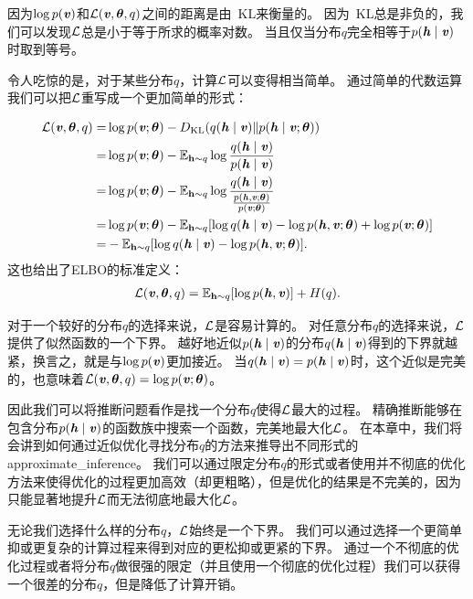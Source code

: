 因为$\log p(\Vv)$和$\CalL(\Vv,{\Vtheta},q)$之间的距离是由~\gls{KL}来衡量的。
因为~\gls{KL}总是非负的，我们可以发现$\CalL$总是小于等于所求的概率对数。
当且仅当分布$q$完全相等于$p(\Vh\mid\Vv)$时取到等号。


令人吃惊的是，对于某些分布$q$，计算$\CalL$可以变得相当简单。
通过简单的代数运算我们可以把$\CalL$重写成一个更加简单的形式：

\begin{align}
\CalL(\Vv,{\Vtheta},q) = & \log p(\Vv;{\Vtheta})- D_{\text{KL}}(q(\Vh\mid\Vv)\Vert p(\Vh\mid\Vv;{\Vtheta})) \\
= & \log p(\Vv;{\Vtheta}) - \SetE_{\RVh\sim q}\log \frac{q(\Vh\mid\Vv)}{p(\Vh\mid\Vv)} \\
= & \log p(\Vv;{\Vtheta}) -  \SetE_{\RVh\sim q} \log \frac{q(\Vh\mid\Vv) }{ \frac{p(\Vh,\Vv;{\Vtheta})}{p(\Vv; {\Vtheta})} } \\
= & \log p(\Vv; {\Vtheta}) -  \SetE_{\RVh\sim q} [\log q(\Vh\mid\Vv) - \log {p(\Vh,\Vv; {\Vtheta})} + \log {p(\Vv; {\Vtheta})} ]\\
= & - \SetE_{\RVh\sim q}[\log q(\Vh\mid\Vv) - \log {p(\Vh,\Vv;{\Vtheta})}].
\end{align}
这也给出了\gls{ELBO}的标准定义：
\begin{align}
\CalL(\Vv,{\Vtheta},q) = \SetE_{\RVh\sim q}[\log p(\Vh , \Vv)] + H(q).
\end{align}


对于一个较好的分布$q$的选择来说，$\CalL$是容易计算的。
对任意分布$q$的选择来说，$\CalL$提供了似然函数的一个下界。
越好地近似$p(\Vh\mid\Vv)$的分布$q(\Vh\mid\Vv)$得到的下界就越紧，换言之，就是与$\log p(\Vv)$更加接近。
当$q(\Vh\mid\Vv) = p(\Vh\mid\Vv)$时，这个近似是完美的，也意味着$\CalL(\Vv,{\Vtheta},q) = \log {p(\Vv;{\Vtheta})} $。


因此我们可以将推断问题看作是找一个分布$q$使得$\CalL$最大的过程。
精确推断能够在包含分布$p(\Vh\mid\Vv)$的函数族中搜索一个函数，完美地最大化$\CalL$。
在本章中，我们将会讲到如何通过近似优化寻找分布$q$的方法来推导出不同形式的\gls{approximate_inference}。
我们可以通过限定分布$q$的形式或者使用并不彻底的优化方法来使得优化的过程更加高效（却更粗略），但是优化的结果是不完美的，因为只能显著地提升$\CalL$而无法彻底地最大化$\CalL$。


无论我们选择什么样的分布$q$，$\CalL$始终是一个下界。
我们可以通过选择一个更简单抑或更复杂的计算过程来得到对应的更松抑或更紧的下界。
通过一个不彻底的优化过程或者将分布$q$做很强的限定（并且使用一个彻底的优化过程）我们可以获得一个很差的分布$q$，但是降低了计算开销。


